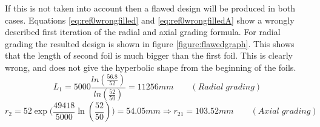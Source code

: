 If this is not taken into account then a flawed design will be produced in both cases.
Equations \ref{eq:ref0wrongfilled} and \ref{eq:ref0wrongfilledA} show a wrongly described first iteration of the radial and axial grading formula. For radial grading the resulted design is shown in figure \ref{figure:flawedgraph}. This shows that the length of second foil is much bigger than the first foil. This is clearly wrong, and does not give the hyperbolic shape from the beginning of the foils.
\begin{equation}
   \label{eq:ref0wrongfilled}
   L_{1} = 5000\displaystyle\frac{{ln(\displaystyle\frac{56.8}{52})} }{ln(\displaystyle\frac{52}{50})}
   = 11256mm \qquad (Radial \; grading)
\end{equation}
\begin{equation}
\label{eq:ref0wrongfilledA}
   r_2 = 52 \displaystyle \exp\big( \frac{49418}{5000} \ln(\frac{52}{50})\big)= 54.05mm\Longrightarrow r_{21}=103.52mm \qquad (Axial \; grading)
\end{equation}


